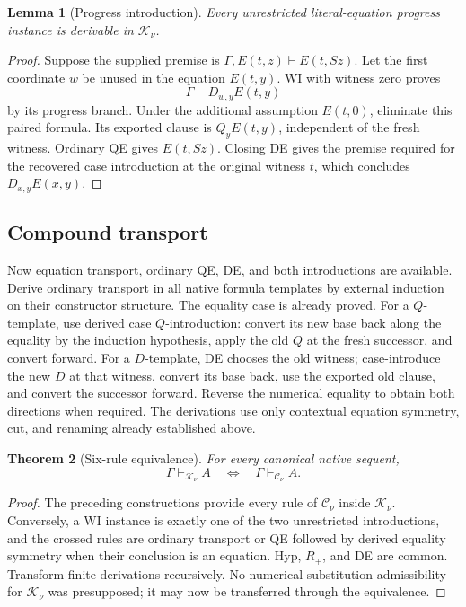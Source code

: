 \documentclass[11pt]{article}
\newtheorem{theorem}{Theorem}[section]
\newtheorem{lemma}[theorem]{Lemma}
\theoremstyle{definition}\newtheorem{definition}[theorem]{Definition}
\newcommand{\Cnorm}{\mathcal C_\nu}
\newcommand{\Knorm}{\mathcal K_\nu}
\begin{document}
\begin{lemma}[Progress introduction]\label{cr:progress}
Every unrestricted literal-equation progress instance is derivable in \(\Knorm\).
\end{lemma}
\begin{proof}
Suppose the supplied premise is
\(\Gamma,E(t,z)\vdash E(t,Sz)\).
Let the first coordinate \(w\) be unused in the equation \(E(t,y)\). WI with witness zero proves
\[
\Gamma\vdash D_{w,y}E(t,y)
\]
by its progress branch. Under the additional assumption \(E(t,0)\), eliminate this paired formula. Its exported clause is \(Q_yE(t,y)\), independent of the fresh witness. Ordinary QE gives \(E(t,Sz)\). Closing DE gives the premise required for the recovered case introduction at the original witness \(t\), which concludes \(D_{x,y}E(x,y)\).
\end{proof}

\subsection{Compound transport}

Now equation transport, ordinary QE, DE, and both introductions are available. Derive ordinary transport in all native formula templates by external induction on their constructor structure. The equality case is already proved. For a \(Q\)-template, use derived case \(Q\)-introduction: convert its new base back along the equality by the induction hypothesis, apply the old \(Q\) at the fresh successor, and convert forward. For a \(D\)-template, DE chooses the old witness; case-introduce the new \(D\) at that witness, convert its base back, use the exported old clause, and convert the successor forward. Reverse the numerical equality to obtain both directions when required. The derivations use only contextual equation symmetry, cut, and renaming already established above.

\begin{theorem}[Six-rule equivalence]\label{cr:six}
For every canonical native sequent,
\[
\Gamma\vdash_{\Knorm}A
\quad\Longleftrightarrow\quad
\Gamma\vdash_{\Cnorm}A.
\]
\end{theorem}
\begin{proof}
The preceding constructions provide every rule of \(\Cnorm\) inside \(\Knorm\). Conversely, a WI instance is exactly one of the two unrestricted introductions, and the crossed rules are ordinary transport or QE followed by derived equality symmetry when their conclusion is an equation. Hyp, \(R_+\), and DE are common. Transform finite derivations recursively. No numerical-substitution admissibility for \(\Knorm\) was presupposed; it may now be transferred through the equivalence.
\end{proof}
\end{document}
